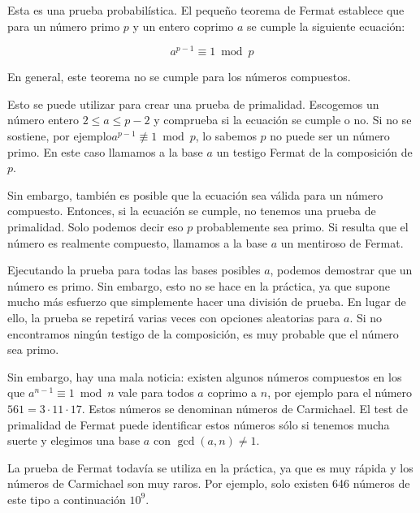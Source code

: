 Esta es una prueba probabilística. El pequeño teorema de Fermat establece que para un número primo $p$ y un entero coprimo $a$ se cumple la siguiente ecuación:

$$a^{p-1} \equiv 1 \bmod p$$

En general, este teorema no se cumple para los números compuestos.

Esto se puede utilizar para crear una prueba de primalidad. Escogemos un número entero $2\le a\le p-2$ y comprueba si la ecuación se cumple o no. Si no se sostiene, por ejemplo$a^{p-1} \not\equiv 1 \bmod p$, lo sabemos $p$ no puede ser un número primo. En este caso llamamos a la base $a$ un testigo Fermat de la composición de $p$.

Sin embargo, también es posible que la ecuación sea válida para un número compuesto. Entonces, si la ecuación se cumple, no tenemos una prueba de primalidad. Solo podemos decir eso $p$ probablemente sea primo. Si resulta que el número es realmente compuesto, llamamos a la base $a$ un mentiroso de Fermat.

Ejecutando la prueba para todas las bases posibles $a$, podemos demostrar que un número es primo. Sin embargo, esto no se hace en la práctica, ya que supone mucho más esfuerzo que simplemente hacer una división de prueba. En lugar de ello, la prueba se repetirá varias veces con opciones aleatorias para $a$. Si no encontramos ningún testigo de la composición, es muy probable que el número sea primo.



Sin embargo, hay una mala noticia: existen algunos números compuestos en los que $a^{n-1} \equiv 1 \bmod n$ vale para todos $a$ coprimo a $n$, por ejemplo para el número $561 = 3 \cdot 11 \cdot 17$. Estos números se denominan números de Carmichael. El test de primalidad de Fermat puede identificar estos números sólo si tenemos mucha suerte y elegimos una base $a$ con $\gcd(a, n) \ne 1$.

La prueba de Fermat todavía se utiliza en la práctica, ya que es muy rápida y los números de Carmichael son muy raros. Por ejemplo, solo existen 646 números de este tipo a continuación $10^9$.

